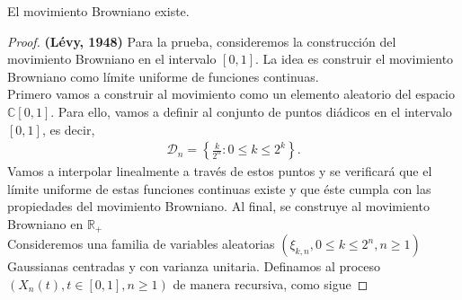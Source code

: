 \begin{theorem}[Wiener, 1923]
El movimiento Browniano existe.
\end{theorem}
\begin{proof}
\textbf{(Lévy, 1948)} Para la prueba, consideremos la construcción del movimiento Browniano en el intervalo $[0, 1]$. La idea es construir el movimiento Browniano como límite uniforme de funciones continuas. \\

Primero vamos a construir al movimiento como un elemento aleatorio del espacio $\mathbb{C}[0, 1]$. Para ello, vamos a definir al conjunto de puntos diádicos en el intervalo $[0, 1]$, es decir, 
	\begin{align*}
		\mathcal{D}_n = \left\{ \frac{k}{2^n} : 0 \leq k \leq 2^k \right\}.
	\end{align*}
Vamos a interpolar linealmente a través de estos puntos y se verificará que el límite uniforme de estas funciones continuas existe y que éste cumpla con las propiedades del movimiento Browniano. Al final, se construye al movimiento Browniano en $\mathbb{R}_{+}$\\

Consideremos una familia de variables aleatorias $(\xi_{k, n}, 0 \leq k \leq 2^n, n \geq 1)$ Gaussianas centradas y con varianza unitaria. Definamos al proceso $(X_n (t), t \in [0, 1], n \geq 1)$ de manera recursiva, como sigue


\end{proof}
